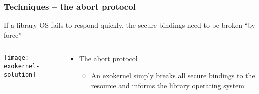 \begin{frame}[plain]
	\frametitle{Techniques -- the abort protocol}
	
	\Large
	If a library OS fails to respond quickly, the secure bindings need to be broken “by force”
	
	\begin{columns}
		
		\begin{column}{.5\textwidth}
			
			\texttt{[image: exokernel-solution]}
			
		\end{column}
		
		\begin{column}{.5\textwidth}
			
			\large
			\begin{itemize}
				\item The abort protocol
				\begin{itemize}
					\item An exokernel simply breaks all secure bindings to the resource and informs the library operating system
					
					
				\end{itemize}

			\end{itemize}
		\end{column}
		
		
	\end{columns}
	
\end{frame}




